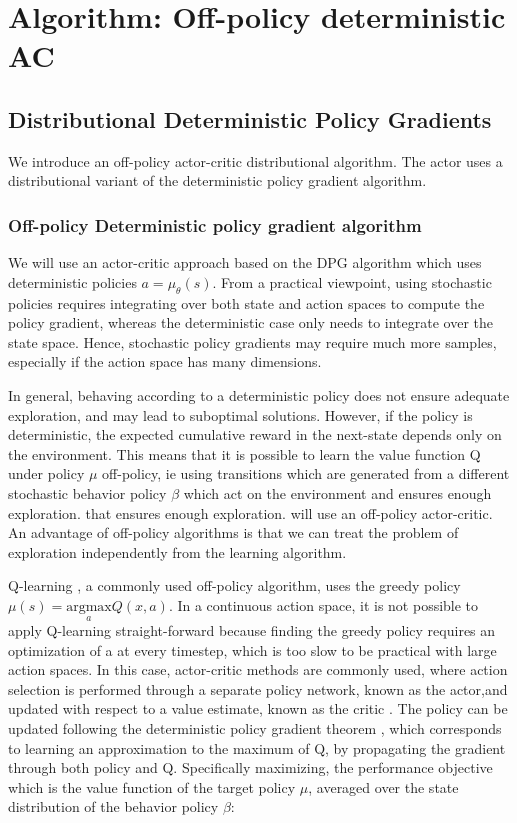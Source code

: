 \chapter{Algorithm: Off-policy deterministic AC}
\label{sec:algo}
\section{Distributional Deterministic Policy Gradients}

We introduce an off-policy actor-critic distributional algorithm.
The actor uses a distributional variant of the deterministic policy gradient algorithm.

\subsection{Off-policy Deterministic policy gradient algorithm}
We will use an actor-critic approach based on the DPG algorithm \citep{silver2014b}
which uses deterministic policies $a=\mu_{\theta}(s)$.
From a practical viewpoint, using stochastic policies requires integrating over both
state and action spaces to compute the policy gradient, whereas the deterministic case
only needs to integrate over the state space. Hence, stochastic policy gradients
may require much more samples, especially if the action space has many dimensions.

In general, behaving according to a deterministic policy does not ensure adequate exploration,
and may lead to suboptimal solutions. 
However, if the policy is deterministic, the expected cumulative reward in the next-state
depends only on the environment. This means that it is possible to learn the value function
Q under policy $\mu$ off-policy, ie using transitions which are generated from a different stochastic
behavior policy $\beta$ which act on the environment and ensures enough exploration.
that ensures enough exploration. will use an off-policy actor-critic.
An advantage of off-policy algorithms is that we can treat the problem of exploration
independently from the learning algorithm.

Q-learning \cite{Watkins1992}, a commonly used off-policy algorithm, uses the greedy policy
$\mu(s)=\underset{a}{\text{argmax}} Q(x,a)$.
In  a  continuous  action  space, it is not possible to apply Q-learning straight-forward because finding the 
greedy policy requires an optimization of a at every timestep, which is too slow to be practical with large action spaces.
In this case, actor-critic methods are commonly used, where action selection is performed through a
separate policy network, known as the actor,and updated with respect to a value estimate,
known as the critic \cite{Sutton1998}.
The policy can be updated following the deterministic policy gradient theorem \cite{silver2014b},
which corresponds to learning an approximation to the maximum of Q,
by propagating the gradient through both policy and Q.
Specifically maximizing, the performance objective which is the value function of the target policy $\mu$, averaged over the state
distribution of the behavior policy $\beta$:

